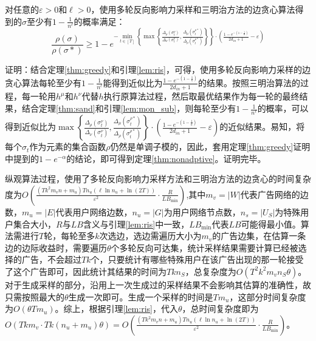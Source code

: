 \begin{theorem}
\label{thm:nonadptive}
对任意的$\varepsilon>0$和$\ell > 0$，使用多轮反向影响力采样和三明治方法的边贪心算法得到的$\sigma$至少有$1-\frac{1}{n^{\ell}}$的概率满足：
\begin{equation}
\frac{\rho(\sigma)}{\rho(\sigma*)} \ge 1-e^{-\min_{t \in [T]}\left\{\max\left\{\frac{\Delta_\rho(\sigma_t^\nu)}{\Delta_\nu(\sigma_t^\nu)},\frac{\Delta_\mu(\sigma_t^{\rho*})}{\Delta_\rho(\sigma_t^{\rho*})} \right\}\right\}\cdot\left(\frac{1-e^{-(1-\frac{1}{k})}}{2d_{in}+1}-\varepsilon\right)}
\end{equation}
\end{theorem}

证明：结合定理\ref{thm:greedy}和引理\ref{lem:ris}，可得，使用多轮反向影响力采样的边贪心算法每轮至少有$1-\frac{1}{n^{\ell}}$能得到近似比为$\frac{1-e^{-(1-\frac{1}{k})}}{2d_{in}+1}$的结果。按照三明治算法的过程，每一轮用$h^\mu$和$h^\nu$代替$h$执行原算法过程，然后取最优结果作为每一轮的最终结果，结合定理\ref{thm:sand}和引理\ref{lem:mon_sub}，则每轮至少有$1-\frac{1}{n^{\ell}}$的概率，可以得到近似比为$\max\left\{\frac{\Delta_\rho(\sigma_t^\nu)}{\Delta_\nu(\sigma_t^\nu)},\frac{\Delta_\mu(\sigma_t^{\rho*})}{\Delta_\rho(\sigma_t^{\rho*})} \right\}\cdot\left(\frac{1-e^{-(1-\frac{1}{k})}}{2d_{in}+1}-\varepsilon\right)$的近似结果。易知，将每个$\sigma_t$作为元素的集合函数$\rho$仍然是单调子模的，因此，套用定理\ref{thm:greedy}证明中提到的$1-e^{-\alpha}$的结论，即可得到定理\ref{thm:nonadptive}。证明完毕。

纵观算法过程，使用了多轮反向影响力采样方法和三明治方法的边贪心的时间复杂度为$O\left(\frac{(Tk^2 m_v n + m_u)Tn_u(\ell \ln n_u + \ln (2T))}{\varepsilon^2}\cdot\frac{R}{LB_{\min}}\right)$,其中$m_v=|W|$代表广告网络的边数，$m_u=|E|$代表用户网络边数，$n_u=|G|$为用户网络节点数，$n_s=|U_S|$为特殊用户集合大小，$R$与$LB$含义与引理\ref{lem:ris}中一致，$LB_{\min}$代表$LB$可能得最小值。算法需进行$T$轮，每轮至多$k$次选边，选边需遍历大小为$m_v$的广告边集，在估算一条边的边际收益时，需要遍历$\theta$个多轮反向可达集，统计采样结果需要计算已经被选择的广告，不会超过$Tk$个，只要统计有哪些特殊用户在该广告出现的那一轮接受了这个广告即可，因此统计其结果的时间为$Tkn_S$，总复杂度为$O(T^2k^2m_vn_S\theta)$。对于生成采样的部分，沿用上一次生成过的采样结果不会影响其估算的准确性，故只需按照最大的$\theta$生成一次即可。生成一个采样的时间是$Tm_u$，这部分时间复杂度为$O(\theta Tm_u)$。综上，根据引理\ref{lem:ris}，代入$\theta$，总时间复杂度即为$O(Tkm_v\cdot Tk(n_u+m_u)\theta) = O\left(\frac{(Tk^2 m_v n + m_u)Tn_u(\ell \ln n_u + \ln (2T))}{\varepsilon^2}\cdot\frac{R}{LB_{\min}}\right)$。


